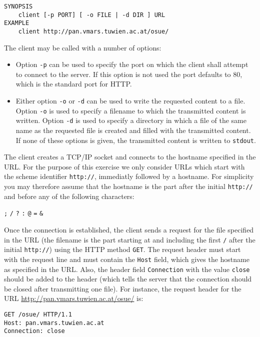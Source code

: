 \begin{verbatim}
SYNOPSIS
    client [-p PORT] [ -o FILE | -d DIR ] URL
EXAMPLE
    client http://pan.vmars.tuwien.ac.at/osue/
\end{verbatim}

The client may be called with a number of options:
\begin{itemize}
\item Option \texttt{-p} can be used to specify the port
on which the client shall attempt to connect to the server.
If this option is not used the port defaults to 80,
which is the standard port for HTTP.
\item Either option \texttt{-o} or \texttt{-d} can be used
to write the requested content to a file.
Option \texttt{-o} is used to specify a filename
to which the transmitted content is written.
Option \texttt{-d} is used to specify a directory
in which a file of the same name as the requested file is created
and filled with the transmitted content.
If none of these options is given,
the transmitted content is written to \verb|stdout|.
\end{itemize}

The client creates a TCP/IP socket
and connects to the hostname specified in the URL.
For the purpose of this exercise we only consider URLs
which start with the scheme identifier \verb|http://|,
immediatly followed by a hostname.
For simplicity you may therefore assume that
the hostname is the part after the initial \verb|http://|
and before any of the following characters:

\texttt{;} \texttt{/} \texttt{?} \texttt{:} \texttt{@} \texttt{=} \texttt{\&}

Once the connection is established,
the client sends a request for the file specified in the URL
(the filename is the part starting at and including the first \texttt{/}
after the initial \verb|http://|)
using the HTTP method \texttt{GET}.
The request header must start with the request line
and must contain the \texttt{Host} field,
which gives the hostname as specified in the URL.
Also, the header field \verb|Connection| with the value \verb|close|
should be added to the header
(which tells the server that the connection should be closed after transmitting one file).
For instance, the request header for the URL
\url{http://pan.vmars.tuwien.ac.at/osue/} is:

\vspace{-2mm}
\begin{verbatim}
GET /osue/ HTTP/1.1
Host: pan.vmars.tuwien.ac.at
Connection: close
\end{verbatim}
\vspace{-2mm}

